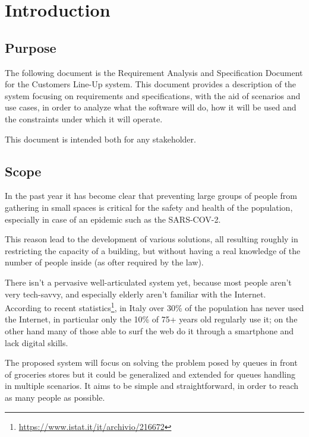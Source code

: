 
\section{Introduction}\label{sec:intro}


\subsection{Purpose}
The following document is the Requirement Analysis and Specification Document for the Customers Line-Up system.
This document provides a description of the system focusing on requirements and specifications, with the aid of scenarios and use cases, in order to analyze what the software will do, how it will be used and the constraints under which it will operate. 

This document is intended both for any stakeholder.

\subsection{Scope}
In the past year it has become clear that preventing large groups of people from gathering in small spaces is critical for the safety and health of the population, especially in case of an epidemic such as the SARS-COV-2.

This reason lead to the development of various solutions, all resulting roughly in restricting the capacity of a building, but without having a real knowledge of the number of people inside (as ofter required by the law).

There isn't a pervasive well-articulated system yet, because most people aren't very tech-savvy, and especially elderly aren't familiar with the Internet.
According to recent statistics\footnote[1]{\url{https://www.istat.it/it/archivio/216672}}, in Italy over 30\% of the population has
never used the Internet, in particular only the 10\% of 75+ years old regularly use it; on the other hand many of those able to surf the web do it through a smartphone and lack digital skills.

The proposed system will focus on solving the problem posed by queues in front of groceries stores but it could be generalized and extended for queues handling in multiple scenarios.
It aims to be simple and straightforward, in order to reach as many people as possible.

